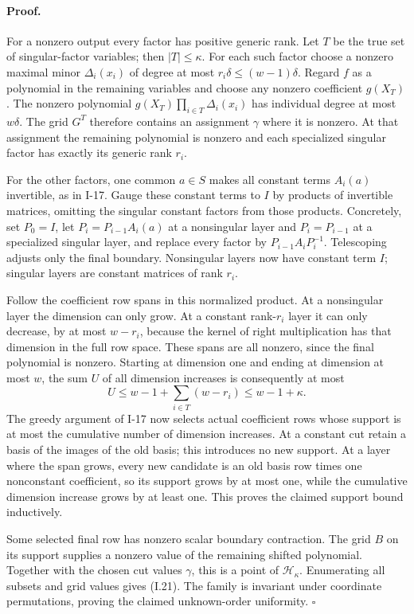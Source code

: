 \documentclass[11pt,a4paper]{article}
\theoremstyle{definition}\newtheorem{definition}{Definition}
\begin{document}
\paragraph{Proof.}
For a nonzero output every factor has positive generic rank.
Let $T$ be the true set of singular-factor variables; then
$|T|\le\kappa$.  For each such factor choose a nonzero maximal
minor $\Delta_i(x_i)$ of degree at most
$r_i\delta\le(w-1)\delta$.  Regard $f$ as a polynomial in the
remaining variables and choose any nonzero coefficient $g(X_T)$.
The nonzero polynomial
$g(X_T)\prod_{i\in T}\Delta_i(x_i)$ has individual degree at most
$w\delta$.  The grid $G^T$ therefore contains an assignment
$\gamma$ where it is nonzero.  At that assignment the remaining
polynomial is nonzero and each specialized singular factor has
exactly its generic rank $r_i$.

For the other factors, one common $a\in S$ makes all constant
terms $A_i(a)$ invertible, as in I-17.  Gauge these constant terms
to $I$ by products of invertible matrices, omitting the singular
constant factors from those products.  Concretely, set $P_0=I$,
let $P_i=P_{i-1}A_i(a)$ at a nonsingular layer and
$P_i=P_{i-1}$ at a specialized singular layer, and replace every
factor by $P_{i-1}A_iP_i^{-1}$.  Telescoping adjusts only the final
boundary.  Nonsingular layers now have constant term $I$;
singular layers are constant matrices of rank $r_i$.

Follow the coefficient row spans in this normalized product.
At a nonsingular layer the dimension can only grow.  At a constant
rank-$r_i$ layer it can only decrease, by at most $w-r_i$, because
the kernel of right multiplication has that dimension in the full
row space.  These spans are all nonzero, since the final polynomial
is nonzero.  Starting at dimension one and ending at dimension at
most $w$, the sum $U$ of all dimension increases is consequently
at most
\[
 U\le w-1+\sum_{i\in T}(w-r_i)\le w-1+\kappa.
\]
The greedy argument of I-17 now selects actual coefficient rows
whose support is at most the cumulative number of dimension
increases.  At a constant cut retain a basis of the images of the
old basis; this introduces no new support.  At a layer where the
span grows, every new candidate is an old basis row times one
nonconstant coefficient, so its support grows by at most one,
while the cumulative dimension increase grows by at least one.
This proves the claimed support bound inductively.

Some selected final row has nonzero scalar boundary contraction.
The grid $B$ on its support supplies a nonzero value of the
remaining shifted polynomial.  Together with the chosen cut
values $\gamma$, this is a point of $\mathcal H_\kappa$.
Enumerating all subsets and grid values gives (I.21).  The family
is invariant under coordinate permutations, proving the claimed
unknown-order uniformity. \hfill$\square$
\end{document}
